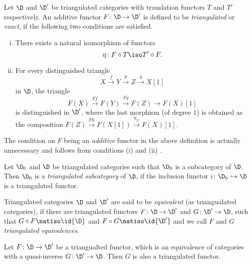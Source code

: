 \begin{definition}
    Let $\D$ and $\D'$ be triangulated categories with translation functors $T$ and $T'$ respectively. An additive functor $F \colon \D \to \D'$ is defined to be \emph{triangulated} or \emph{exact}, if the following two conditions are satisfied.
    \begin{enumerate}[(i)]
        \item There exists a natural isomorphism of functors 
        \[
            \eta \colon F \circ T \iso T' \circ F.
        \]
        \item For every distinguished triangle
        \[
            X\xrightarrow{f} Y \xrightarrow{g} Z \xrightarrow{h} X[1]
        \]
        in $\D$, the triangle
        \[
            F(X) \xrightarrow{Ff} F(Y) \xrightarrow{Fg} F(Z) \to F(X)[1] 
        \]
        is distinguished in $\D'$, where the last morphism (of degree $1$) is obtained as the composition $F(Z) \xrightarrow{Fh} F(X[1]) \xrightarrow{\eta_X} F(X)[1]$.
    \end{enumerate}
\end{definition}

\begin{remark}
    The condition on $F$ being an \emph{additive} functor in the above definition is actually unnecessary and follows from conditions (i) and (ii) \cite[\href{https://stacks.math.columbia.edu/tag/05QY}{Tag 05QY}]{stacks-project}.
\end{remark}

\begin{definition}
    Let $\D_0$ and $\D$ be triangulated categories such that $\D_0$ is a subcategory of $\D$. Then $\D_0$ is a \emph{triangulated subcategory} of $\D$, if the inclusion functor $i \colon \D_0 \hookrightarrow \D$ is a triangulated functor. 
\end{definition}

\begin{definition}
    Triangulated categories $\D$ and $\D'$ are said to be \emph{equivalent} (as triangualated categories), if there are triangulated functors $F \colon \D \to \D'$ and $G \colon \D' \to \D$, such that $G \circ F \natiso \id{\D}$ and $F \circ G \natiso \id{\D'}$ and we call $F$ and $G$ \emph{triangulated equivalences}.
\end{definition}

\begin{proposition}
    Let $F \colon \D \to \D'$ be a triangualted functor, which is an equivalence of categories with a quasi-inverse $G \colon \D' \to \D$. Then $G$ is also a triangulated  functor. 
\end{proposition}

